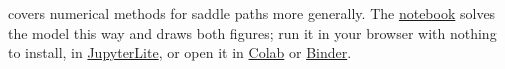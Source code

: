 \documentclass{econark}
\begin{document}
{  \citet{judd:book} covers numerical methods for saddle paths more generally.  The \href{\Notebook}{notebook} solves the model this way and draws both figures; run it in your browser with nothing to install, in \href{\BookNotebookLite}{JupyterLite}, or open it in \href{\NotebookColab}{Colab} or \href{\NotebookBinder}{Binder}.
}{}
\end{document}
